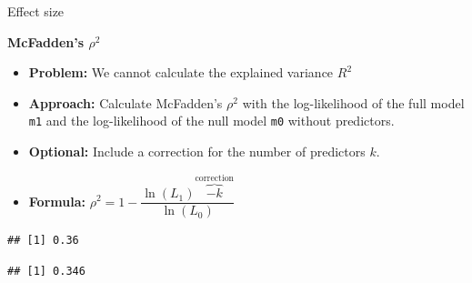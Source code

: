 \documentclass[
  ignorenonframetext,
]{beamer}
\newenvironment{Shaded}{\begin{snugshade}}{\end{snugshade}}
\newcommand{\CommentTok}[1]{\textcolor[rgb]{0.56,0.35,0.01}{\textit{#1}}}
\newcommand{\DataTypeTok}[1]{\textcolor[rgb]{0.13,0.29,0.53}{#1}}
\newcommand{\DecValTok}[1]{\textcolor[rgb]{0.00,0.00,0.81}{#1}}
\newcommand{\KeywordTok}[1]{\textcolor[rgb]{0.13,0.29,0.53}{\textbf{#1}}}
\newcommand{\NormalTok}[1]{#1}
\newcommand{\OperatorTok}[1]{\textcolor[rgb]{0.81,0.36,0.00}{\textbf{#1}}}
\newcommand{\StringTok}[1]{\textcolor[rgb]{0.31,0.60,0.02}{#1}}
\providecommand{\tightlist}{%
  \setlength{\itemsep}{0pt}\setlength{\parskip}{0pt}}
\begin{document}
\begin{frame}[fragile]{Effect size}
\protect\hypertarget{effect-size}{}

\textbf{McFadden's \(\rho^2\)}

\begin{itemize}
\tightlist
\item
  \textbf{Problem:} We cannot calculate the explained variance \(R^2\)
\item
  \textbf{Approach:} Calculate McFadden's \(\rho^2\) with the
  log-likelihood of the full model \texttt{m1} and the log-likelihood of
  the null model \texttt{m0} without predictors.
\item
  \textbf{Optional:} Include a correction for the number of predictors
  \(k\).
\item
  \textbf{Formula:}
  \(\rho^2=1-\dfrac{\ln(L_1)\overbrace{-k}^{\text{correction}}}{\ln(L_0)}\)
\end{itemize}

\tiny

\begin{Shaded}
\end{Shaded}

\begin{verbatim}
## [1] 0.36
\end{verbatim}

\begin{Shaded}
\end{Shaded}

\begin{verbatim}
## [1] 0.346
\end{verbatim}

\normalsize

\end{frame}
\end{document}

